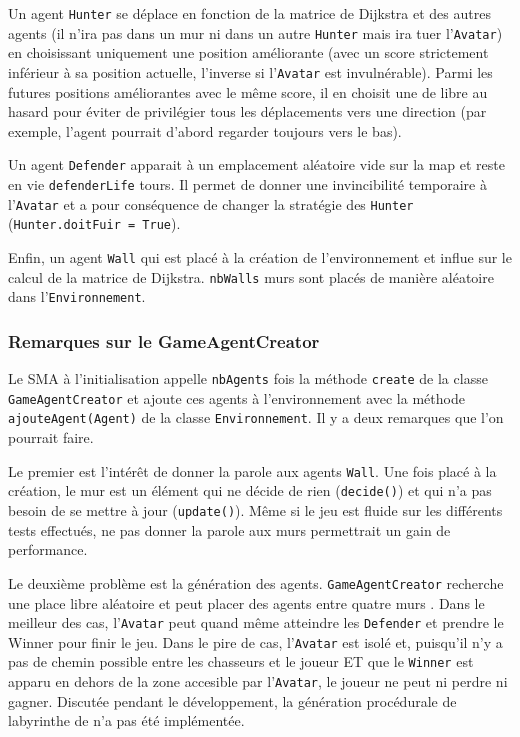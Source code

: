 \documentclass[a4paper]{article}
\begin{document}
\medskip
Un agent \texttt{Hunter} se déplace en fonction de la matrice de Dijkstra et des autres agents (il n'ira pas dans un mur ni dans un autre \texttt{Hunter} mais ira tuer l'\texttt{Avatar}) en choisissant uniquement une position améliorante (avec un score strictement inférieur à sa position actuelle, l'inverse si l'\texttt{Avatar} est invulnérable). Parmi les futures positions améliorantes avec le même score, il en choisit une de libre au hasard pour éviter de privilégier tous les déplacements vers une direction (par exemple, l'agent pourrait d'abord regarder toujours vers le bas).

\medskip
Un agent \texttt{Defender} apparait à un emplacement aléatoire vide sur la map et reste en vie \texttt{defenderLife} tours. Il permet de donner une invincibilité temporaire à l'\texttt{Avatar} et a pour conséquence de changer la stratégie des \texttt{Hunter} (\texttt{Hunter.doitFuir = True}).

\medskip
Enfin, un agent \texttt{Wall} qui est placé à la création de l'environnement et influe sur le calcul de la matrice de Dijkstra. \texttt{nbWalls} murs sont placés de manière aléatoire dans l'\texttt{Environnement}.

\subsubsection{Remarques sur le GameAgentCreator}
Le SMA à l'initialisation appelle \texttt{nbAgents} fois la méthode \texttt{create} de la classe \texttt{GameAgentCreator} et ajoute ces agents à l'environnement avec la méthode \texttt{ajouteAgent(Agent)} de la classe \texttt{Environnement}. Il y a deux remarques que l'on pourrait faire.

\medskip
Le premier est l'intérêt de donner la parole aux agents \texttt{Wall}. Une fois placé à la création, le mur est un élément qui ne décide de rien (\texttt{decide()}) et qui n'a pas besoin de se mettre à jour (\texttt{update()}). Même si le jeu est fluide sur les différents tests effectués, ne pas donner la parole aux murs permettrait un gain de performance.

\medskip
Le deuxième problème est la génération des agents. \texttt{GameAgentCreator} recherche une place libre aléatoire et peut placer des agents \og entre quatre murs \fg{}. Dans le meilleur des cas, l'\texttt{Avatar} peut quand même atteindre les \texttt{Defender} et prendre le Winner pour finir le jeu.  Dans le pire de cas, l'\texttt{Avatar} est isolé et, puisqu'il n'y a pas de chemin possible entre les chasseurs et le joueur ET que le \texttt{Winner} est apparu en dehors de la zone accesible par l'\texttt{Avatar}, le joueur ne peut ni perdre ni gagner. Discutée pendant le développement, la génération procédurale de labyrinthe de n'a pas été implémentée.
\end{document}
